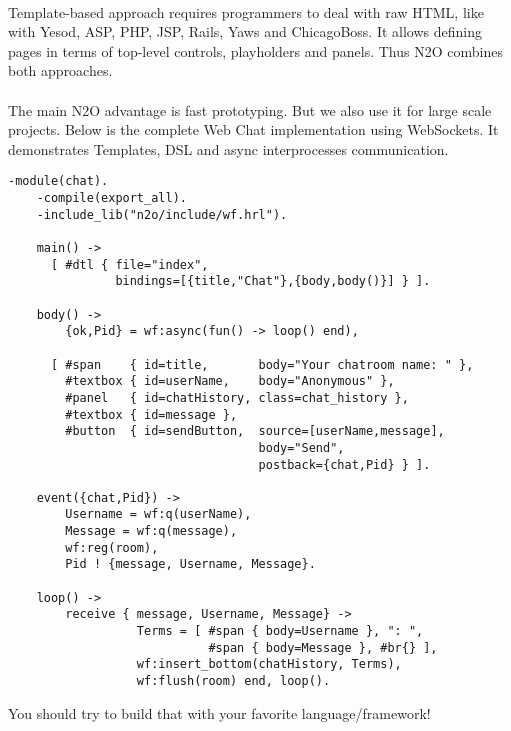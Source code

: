 \paragraph{}
Template-based approach requires programmers to deal with raw HTML,
like with Yesod, ASP, PHP, JSP, Rails, Yaws and ChicagoBoss. It allows
defining pages in terms of top-level controls, playholders
and panels. Thus N2O combines both approaches.

\paragraph{}
The main N2O advantage is fast prototyping. But we also use it for large
scale projects. Below is the complete Web Chat implementation using
WebSockets. It demonstrates Templates, DSL and async
interprocesses communication.

\newpage
\vspace{1\baselineskip}
\begin{lstlisting}[caption=chat.erl]
    -module(chat).
    -compile(export_all).
    -include_lib("n2o/include/wf.hrl").

    main() -> 
      [ #dtl { file="index", 
               bindings=[{title,"Chat"},{body,body()}] } ].

    body() ->
        {ok,Pid} = wf:async(fun() -> loop() end),

      [ #span    { id=title,       body="Your chatroom name: " }, 
        #textbox { id=userName,    body="Anonymous" },
        #panel   { id=chatHistory, class=chat_history },
        #textbox { id=message },
        #button  { id=sendButton,  source=[userName,message],
                                   body="Send", 
                                   postback={chat,Pid} } ].

    event({chat,Pid}) ->
        Username = wf:q(userName),
        Message = wf:q(message),
        wf:reg(room),
        Pid ! {message, Username, Message}.

    loop() ->
        receive { message, Username, Message} ->
                  Terms = [ #span { body=Username }, ": ",
                            #span { body=Message }, #br{} ],
                  wf:insert_bottom(chatHistory, Terms),
                  wf:flush(room) end, loop().
\end{lstlisting}
\vspace{1\baselineskip}

You should try to build that with your favorite language/framework!

